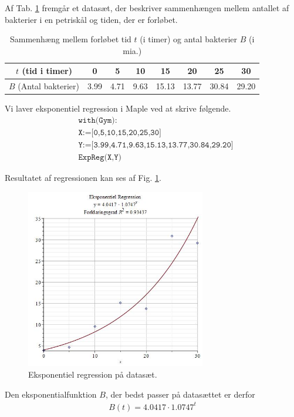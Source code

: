 \begin{exa}
Af Tab. \ref{tab:1} fremgår et datasæt, der beskriver sammenhængen mellem antallet af bakterier i en petriskål og tiden, der er forløbet.
\begin{table}[H]
	\centering
	\begin{tabular}{c|c|c|c|c|c|c|c}
		$t$ (tid i timer) & 0 & 5 & 10 & 15 & 20 & 25 & 30\\
		\hline
		$B$ (Antal bakterier) & 3.99 & 4.71 & 9.63 & 15.13 & 13.77 & 30.84 & 29.20
	\end{tabular}
	\caption{Sammenhæng mellem forløbet tid $t$ (i timer) og antal bakterier $B$ (i mia.)}
	\label{tab:1}
\end{table}

Vi laver eksponentiel regression i Maple ved at skrive følgende.
\begin{align*}
	&\texttt{with(Gym):}\\
	&\texttt{X:=[0,5,10,15,20,25,30]}\\
	&\texttt{Y:=[3.99,4.71,9.63,15.13,13.77,30.84,29.20]}\\
	&\texttt{ExpReg(X,Y)}
\end{align*}

Resultatet af regressionen kan ses af Fig. \ref{fig:regres}.
\begin{figure}[H]
	\centering
	\includegraphics[width=0.7\textwidth]{Billeder/EkspReg.jpg}
	\caption{Eksponentiel regression på datasæt.}
	\label{fig:regres}
\end{figure}
Den eksponentialfunktion $B$, der bedst passer på datasættet er derfor
\begin{align*}
	B(t) = 4.0417\cdot 1.0747^t
\end{align*}

\end{exa}

